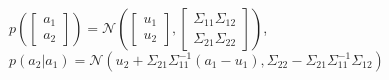 $p(\begin{bmatrix}a_1\\a_2\end{bmatrix}) = \mathcal{N}(\begin{bmatrix}u_1\\u_2\end{bmatrix}, \begin{bmatrix}\Sigma_{11} \Sigma_{12}\\ \Sigma_{21} \Sigma_{22}\end{bmatrix})$,
$p(a_2 | a_1) = \mathcal{N}(u_2 + \Sigma_{21}\Sigma_{11}^{-1}(a_1-u_1), \Sigma_{22}-\Sigma_{21}\Sigma_{11}^{-1}\Sigma_{12})$
\\
